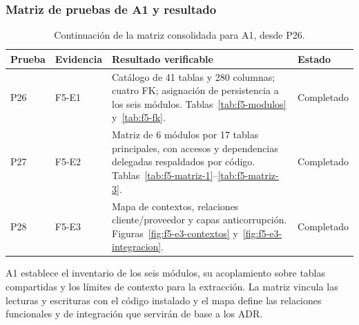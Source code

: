 \subsubsection{Matriz de pruebas de A1 y resultado}
\begin{table}[H]
\centering\small
\begin{tabularx}{\textwidth}{p{1.3cm}p{1.8cm}Xp{2.3cm}}
\toprule
\textbf{Prueba} & \textbf{Evidencia} & \textbf{Resultado verificable} & \textbf{Estado} \\
\midrule
P26 & F5-E1 & Catálogo de 41 tablas y 280 columnas; cuatro FK; asignación de persistencia a los seis módulos. Tablas~\ref{tab:f5-modulos} y~\ref{tab:f5-fk}. & Completado \\
P27 & F5-E2 & Matriz de 6 módulos por 17 tablas principales, con accesos y dependencias delegadas respaldados por código. Tablas~\ref{tab:f5-matriz-1}--\ref{tab:f5-matriz-3}. & Completado \\
P28 & F5-E3 & Mapa de contextos, relaciones cliente/proveedor y capas anticorrupción. Figuras~\ref{fig:f5-e3-contextos} y~\ref{fig:f5-e3-integracion}. & Completado \\
\bottomrule
\end{tabularx}
\caption{Continuación de la matriz consolidada para A1, desde P26.}
\label{tab:f5-pruebas}
\end{table}

A1 establece el inventario de los seis módulos, su acoplamiento sobre tablas
compartidas y los límites de contexto para la extracción. La matriz vincula
las lecturas y escrituras con el código instalado y el mapa define las
relaciones funcionales y de integración que servirán de base a los ADR.


\endgroup

